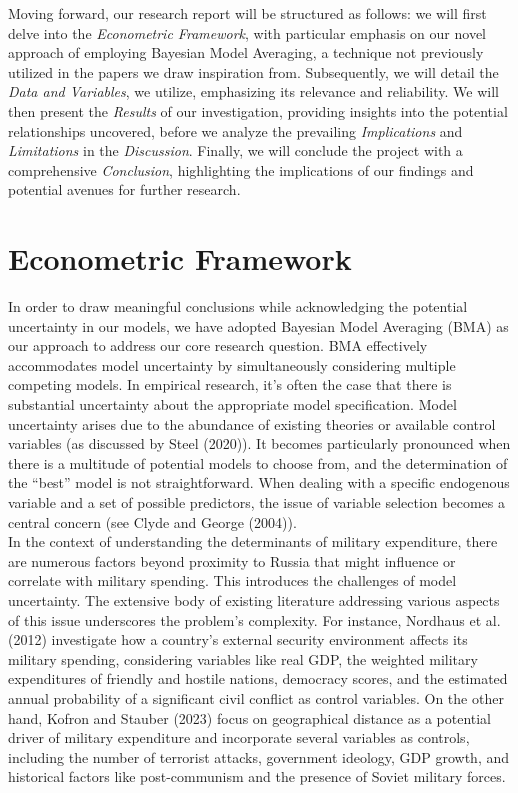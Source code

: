\documentclass[12pt,a4paper]{article}
\begin{document}
Moving forward, our research report will be structured as follows: we will first delve into the \textit{Econometric Framework}, with particular emphasis on our novel approach of employing Bayesian Model Averaging, a technique not previously utilized in the papers we draw inspiration from. Subsequently, we will detail the \textit{Data and Variables}, we utilize, emphasizing its relevance and reliability. We will then present the \textit{Results} of our investigation, providing insights into the potential relationships uncovered, before we analyze the prevailing \textit{Implications} and \textit{Limitations}   in the \textit{Discussion}. Finally, we will conclude the project with a comprehensive \emph{Conclusion}, highlighting the implications of our findings and potential avenues for further research.

\section{Econometric Framework}
In order to draw meaningful conclusions while acknowledging the potential uncertainty in our models, we have adopted Bayesian Model Averaging (BMA) as our approach to address our core research question. BMA effectively accommodates model uncertainty by simultaneously considering multiple competing models. In empirical research, it’s often the case that there is substantial uncertainty about the appropriate model specification. Model uncertainty arises due to the abundance of existing theories or available control variables (as discussed by Steel (2020)). It becomes particularly pronounced when there is a multitude of potential models to choose from, and the determination of the “best” model is not straightforward. When dealing with a specific endogenous variable and a set of possible predictors, the issue of variable selection becomes a central concern (see Clyde and George (2004)). \\

In the context of understanding the determinants of military expenditure, there are numerous factors beyond proximity to Russia that might influence or correlate with military spending. This introduces the challenges of model uncertainty. The extensive body of existing literature addressing various aspects of this issue underscores the problem’s complexity. For instance, Nordhaus et al. (2012) investigate how a country’s external security environment affects its military spending, considering variables like real GDP, the weighted military expenditures of friendly and hostile nations, democracy scores, and the estimated annual probability of a significant civil conflict as control variables. On the other hand, Kofron and Stauber (2023) focus on geographical distance as a potential driver of military expenditure and incorporate several variables as controls, including the number of terrorist attacks, government ideology, GDP growth, and historical factors like post-communism and the presence of Soviet military forces. \\
\end{document}
